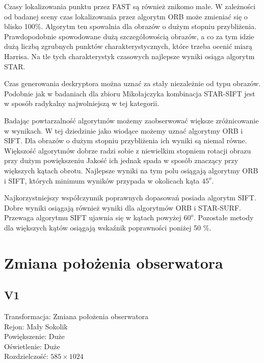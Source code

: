Czasy lokalizowania punktu przez FAST są również znikomo małe. W zależności od badanej sceny czas lokalizowania przez algorytm ORB może zmieniać się o blisko 100\%. Algorytm ten spowalnia dla obrazów o dużym stopniu przybliżenia. Prawdopodobnie spowodowane dużą szczegółowością obrazów, a co za tym idzie dużą liczbą zgrubnych punktów charakterystycznych, które trzeba ocenić miarą Harrisa. Na tle tych charakterystyk czasowych najlepsze wyniki osiąga algorytm STAR.

Czas generowania deskryptora można uznać za stały niezależnie od typu obrazów. Podobnie jak w badaniach dla zbioru Mikołajczyka kombinacja STAR-SIFT jest w sposób radykalny najwolniejszą w tej kategorii.

Badając powtarzalność algorytmów możemy zaobserwować większe zróżnicowanie w wynikach. W tej dziedzinie jako wiodące możemy uznać algorytmy ORB i SIFT. Dla obrazów o dużym stopniu przybliżenia ich wyniki są niemal równe. Większość algorytmów dobrze radzi sobie z niewielkim stopniem rotacji obrazu przy dużym powiększeniu Jakość ich jednak spada w sposób znaczący przy większych kątach obrotu. Najlepsze wyniki na tym polu osiągają algorytmy ORB i SIFT, których minimum wyników przypada w okolicach kąta $45^o$.

Najkorzystniejszy współczynnik poprawnych dopasowań posiada algorytm SIFT. Dobre wyniki osiągają również wyniki dla algorytmów ORB i STAR-SURF. Przewaga algorytmu SIFT ujawnia się w kątach powyżej $60^o$. Pozostałe metody dla większych kątów osiągają wskaźnik poprawności poniżej 50 \%.





\FloatBarrier
\newpage
\section{Zmiana położenia obserwatora}
\FloatBarrier
\subsection{V1}
Transformacja: Zmiana położenia obserwatora\\
Rejon: Mały Sokolik\\
Powiększenie: Duże\\
Oświetlenie: Duże\\
Rozdzielczość: $585 \times 1024$

